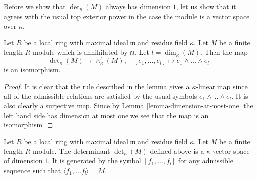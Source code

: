 \noindent
Before we show that $\det_\kappa(M)$ always has dimension $1$,
let us show that it agrees with the usual top exterior power in
the case the module is a vector space over $\kappa$.

\begin{lemma}
\label{lemma-compare-det}
Let $R$ be a local ring with maximal ideal $\mathfrak m$ and
residue field $\kappa$. Let $M$ be a finite length $R$-module
which is annihilated by $\mathfrak m$. Let $l = \dim_\kappa(M)$.
Then the map
$$
\det\nolimits_\kappa(M) \longrightarrow \wedge^l_\kappa(M),
\quad
[e_1, \ldots, e_l] \longmapsto e_1 \wedge \ldots \wedge e_l
$$
is an isomorphism.
\end{lemma}

\begin{proof}
It is clear that the rule described in the lemma gives a $\kappa$-linear
map since all of the admissible relations are satisfied by the usual
symbols $e_1 \wedge \ldots \wedge e_l$. It is also clearly a surjective
map. Since by Lemma \ref{lemma-dimension-at-most-one} the left hand side
has dimension at most one
we see that the map is an isomorphism.
\end{proof}

\begin{lemma}
\label{lemma-determinant-dimension-one}
Let $R$ be a local ring with maximal ideal $\mathfrak m$ and
residue field $\kappa$. Let $M$ be a finite length $R$-module.
The determinant $\det_\kappa(M)$ defined above is a $\kappa$-vector
space of dimension $1$. It is generated by the symbol
$[f_1, \ldots, f_l]$ for any admissible sequence such
that $\langle f_1, \ldots f_l \rangle = M$.
\end{lemma}

